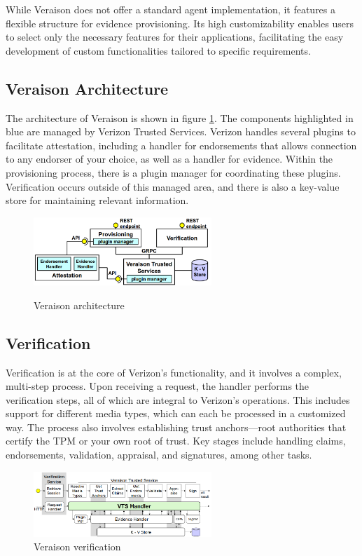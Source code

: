 While Veraison does not offer a standard agent implementation, it
features a flexible structure for evidence provisioning. Its high
customizability enables users to select only the necessary features
for their applications, facilitating the easy development of custom
functionalities tailored to specific requirements.

\subsection{Veraison Architecture}
The architecture of Veraison is shown in figure
\ref{fig:veraison-architecture}. The components highlighted in blue
are managed by Verizon Trusted Services. Verizon handles several
plugins to facilitate attestation, including a handler for
endorsements that allows connection to any endorser of your choice, as
well as a handler for evidence. Within the provisioning process, there
is a plugin manager for coordinating these plugins. Verification
occurs outside of this managed area, and there is also a key-value
store for maintaining relevant information. 
\begin{figure}[H]
  \centering
  \includegraphics[width=0.6\textwidth]{img/veraison architecture.png}
  \label{fig:veraison-architecture}
  \caption{Veraison architecture}
\end{figure}

\subsection{Verification}
Verification is at the core of Verizon's functionality, and it
involves a complex, multi-step process. Upon receiving a request, the
handler performs the verification steps, all of which are integral to
Verizon’s operations. This includes support for different media types,
which can each be processed in a customized way. The process also
involves establishing trust anchors—root authorities that certify the
TPM or your own root of trust. Key stages include handling claims,
endorsements, validation, appraisal, and signatures, among other
tasks.

\begin{figure}[H]
  \centering
  \includegraphics[width=0.6\textwidth]{img/verizon verification.png}
  \caption{Veraison verification}
\end{figure}
